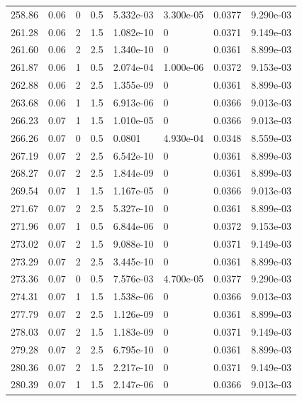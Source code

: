 \documentclass[preview]{standalone}
\begin{document}
{{{{{\begin{tabular}{L{1.2cm}C{1.2cm} C{0.3cm}C{0.5cm} C{1.4cm}C{1.4cm} C{1.4cm}C{1.4cm}}
  258.86  &  0.06  & 0     & 0.5 &  5.332e-03  & 3.300e-05  & 0.0377 &  9.290e-03   \\ 
  261.28  &  0.06  & 2     & 1.5 &  1.082e-10  & 0  & 0.0371 &  9.149e-03   \\ 
  261.60  &  0.06  & 2     & 2.5 &  1.340e-10  & 0  & 0.0361 &  8.899e-03   \\ 
  261.87  &  0.06  & 1     & 0.5 &  2.074e-04  & 1.000e-06  & 0.0372 &  9.153e-03   \\ 
  262.88  &  0.06  & 2     & 2.5 &  1.355e-09  & 0  & 0.0361 &  8.899e-03   \\ 
  263.68  &  0.06  & 1     & 1.5 &  6.913e-06  & 0  & 0.0366 &  9.013e-03   \\ 
  266.23  &  0.07  & 1     & 1.5 &  1.010e-05  & 0  & 0.0366 &  9.013e-03   \\ 
  266.26  &  0.07  & 0     & 0.5 &  0.0801  & 4.930e-04  & 0.0348 &  8.559e-03   \\ 
  267.19  &  0.07  & 2     & 2.5 &  6.542e-10  & 0  & 0.0361 &  8.899e-03   \\ 
  268.27  &  0.07  & 2     & 2.5 &  1.844e-09  & 0  & 0.0361 &  8.899e-03   \\ 
  269.54  &  0.07  & 1     & 1.5 &  1.167e-05  & 0  & 0.0366 &  9.013e-03   \\ 
  271.67  &  0.07  & 2     & 2.5 &  5.327e-10  & 0  & 0.0361 &  8.899e-03   \\ 
  271.96  &  0.07  & 1     & 0.5 &  6.844e-06  & 0  & 0.0372 &  9.153e-03   \\ 
  273.02  &  0.07  & 2     & 1.5 &  9.088e-10  & 0  & 0.0371 &  9.149e-03   \\ 
  273.29  &  0.07  & 2     & 2.5 &  3.445e-10  & 0  & 0.0361 &  8.899e-03   \\ 
  273.36  &  0.07  & 0     & 0.5 &  7.576e-03  & 4.700e-05  & 0.0377 &  9.290e-03   \\ 
  274.31  &  0.07  & 1     & 1.5 &  1.538e-06  & 0  & 0.0366 &  9.013e-03   \\ 
  277.79  &  0.07  & 2     & 2.5 &  1.126e-09  & 0  & 0.0361 &  8.899e-03   \\ 
  278.03  &  0.07  & 2     & 1.5 &  1.183e-09  & 0  & 0.0371 &  9.149e-03   \\ 
  279.28  &  0.07  & 2     & 2.5 &  6.795e-10  & 0  & 0.0361 &  8.899e-03   \\ 
  280.36  &  0.07  & 2     & 1.5 &  2.217e-10  & 0  & 0.0371 &  9.149e-03   \\ 
  280.39  &  0.07  & 1     & 1.5 &  2.147e-06  & 0  & 0.0366 &  9.013e-03   \\ 

\end{tabular}}}}}}
\end{document}
